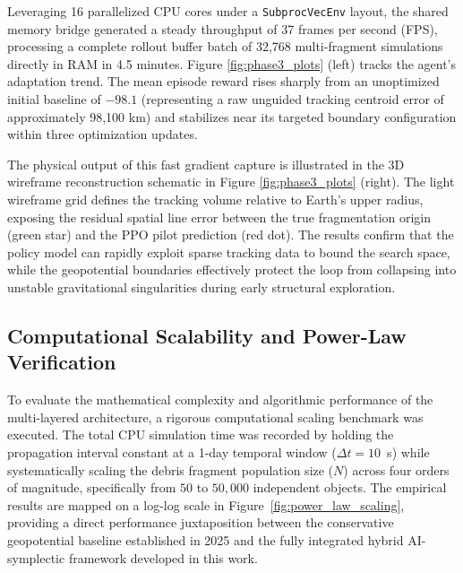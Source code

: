 \documentclass[letterpaper,11pt]{AAS}
\begin{document}
Leveraging 16 parallelized CPU cores under a \texttt{SubprocVecEnv} layout, the shared memory bridge generated a steady throughput of 37 frames per second (FPS), processing a complete rollout buffer batch of 32,768 multi-fragment simulations directly in RAM in 4.5 minutes. Figure \ref{fig:phase3_plots} (left) tracks the agent's adaptation trend. The mean episode reward rises sharply from an unoptimized initial baseline of $-98.1$ (representing a raw unguided tracking centroid error of approximately 98,100 km) and stabilizes near its targeted boundary configuration within three optimization updates. 

The physical output of this fast gradient capture is illustrated in the 3D wireframe reconstruction schematic in Figure \ref{fig:phase3_plots} (right). The light wireframe grid defines the tracking volume relative to Earth's upper radius, exposing the residual spatial line error between the true fragmentation origin (green star) and the PPO pilot prediction (red dot). The results confirm that the policy model can rapidly exploit sparse tracking data to bound the search space, while the geopotential boundaries effectively protect the loop from collapsing into unstable gravitational singularities during early structural exploration.

\subsection{Computational Scalability and Power-Law Verification}
\label{subsec:scalability_analysis}

To evaluate the mathematical complexity and algorithmic performance of the multi-layered architecture, a rigorous computational scaling benchmark was executed. The total CPU simulation time was recorded by holding the propagation interval constant at a 1-day temporal window ($\Delta t = 10$~s) while systematically scaling the debris fragment population size ($N$) across four orders of magnitude, specifically from $50$ to $50,000$ independent objects. The empirical results are mapped on a log-log scale in Figure~\ref{fig:power_law_scaling}, providing a direct performance juxtaposition between the conservative geopotential baseline established in 2025 \cite{puerta-ibarra_advanced_2025} and the fully integrated hybrid AI-symplectic framework developed in this work.
\end{document}
